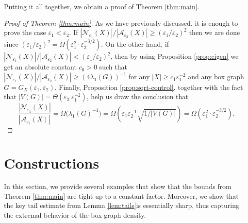 \documentclass[12pt]{article}
\newcommand{\eps}{\varepsilon}
\begin{document}
Putting it all together, we obtain a proof of Theorem \ref{thm:main}.
\begin{proof}[Proof of Theorem \ref{thm:main}]
    As we have previously discussed, it is enough to prove the case ${\eps_1<\eps_2}$. If ${|\mathcal{N}_{\eps_1}(X)|/|\mathcal{A}_{\eps_2}(X)|\geq (\eps_1/\eps_2)^2}$ then we are done since  $(\eps_1/\eps_2)^2=\Omega(\eps_1^2\cdot \eps_2^{-3/2})$. On the other hand, if $|\mathcal{N}_{\eps_1}(X)|/|\mathcal{A}_{\eps_2}(X)|< (\eps_1/\eps_2)^2$, then by using Proposition \ref{prop:eigen} we get an absolute constant $c_0>0$ such that  $|\mathcal{N}_{\eps_1}(X)|/|\mathcal{A}_{\eps_2}(X)|\geq \left(4\lambda_1(G)\right)^{-1}$ for any $|X|\ge c_1\eps_1^{-2}$ and any box graph $G=G_X(\eps_1,\eps_2)$. Finally, Proposition \ref{prop:sqrt-control}, together with the fact that $|V(G)|=\Theta(\eps_2\ \eps_1^{-2})$, help us draw the conclusion that 
    $$\dfrac{|\mathcal{N}_{\eps_1}(X)|}{|\mathcal{A}_{\eps_2}(X)|}=\Omega\big(\lambda_1(G)^{-1}\big) =\Omega\left(\eps_1\eps_2^{-1}\sqrt{1/|V(G)|}\right)= \Omega\left( \eps_1^2\cdot \eps_2^{-3/2}\right).$$ 
\end{proof}


    

\section{Constructions}\label{sec:examples}

In this section, we provide several examples that show that the bounds from Theorem \ref{thm:main} are tight up to a constant factor. Moreover, we show that the key tail estimate from Lemma \ref{lem:tails}\linebreak is essentially sharp, thus capturing the extremal behavior of the box graph density.
\end{document}
